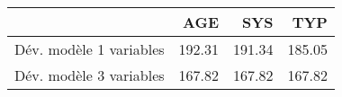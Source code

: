 \begin{tabular}{rrrr}
  \hline
 & AGE & SYS & TYP \\ 
  \hline
Dév. modèle 1 variables & 192.31 & 191.34 & 185.05 \\ 
  Dév. modèle 3 variables & 167.82 & 167.82 & 167.82 \\ 
   \hline
\end{tabular}
